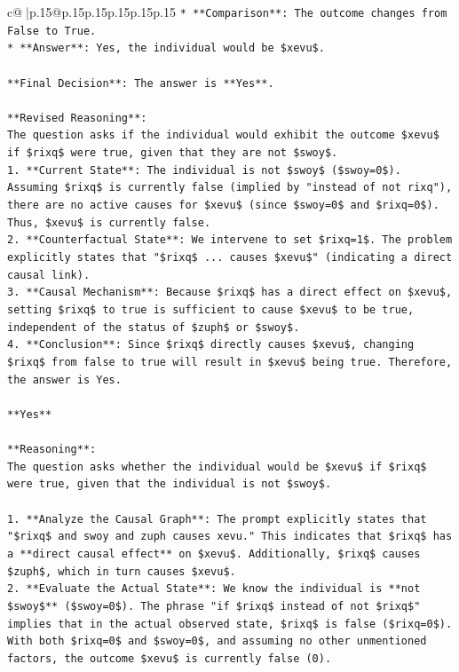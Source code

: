 \documentclass{article}
\begin{document}
{\begin{supertabular}{c@{$\;$}|p{.15\linewidth}@{}p{.15\linewidth}p{.15\linewidth}p{.15\linewidth}p{.15\linewidth}p{.15\linewidth}}
{{{\texttt{*   **Comparison**: The outcome changes from False to True.} \\
\texttt{*   **Answer**: Yes, the individual would be \$xevu\$.} \\
\\ 
\texttt{**Final Decision**: The answer is **Yes**.} \\
\\ 
\texttt{**Revised Reasoning**:} \\
\texttt{The question asks if the individual would exhibit the outcome \$xevu\$ if \$rixq\$ were true, given that they are not \$swoy\$.} \\
\texttt{1.  **Current State**: The individual is not \$swoy\$ (\$swoy=0\$). Assuming \$rixq\$ is currently false (implied by "instead of not rixq"), there are no active causes for \$xevu\$ (since \$swoy=0\$ and \$rixq=0\$). Thus, \$xevu\$ is currently false.} \\
\texttt{2.  **Counterfactual State**: We intervene to set \$rixq=1\$. The problem explicitly states that "\$rixq\$ ... causes \$xevu\$" (indicating a direct causal link).} \\
\texttt{3.  **Causal Mechanism**: Because \$rixq\$ has a direct effect on \$xevu\$, setting \$rixq\$ to true is sufficient to cause \$xevu\$ to be true, independent of the status of \$zuph\$ or \$swoy\$.} \\
\texttt{4.  **Conclusion**: Since \$rixq\$ directly causes \$xevu\$, changing \$rixq\$ from false to true will result in \$xevu\$ being true. Therefore, the answer is Yes.} \\
\\ 
\texttt{**Yes**} \\
\\ 
\texttt{**Reasoning**:} \\
\texttt{The question asks whether the individual would be \$xevu\$ if \$rixq\$ were true, given that the individual is not \$swoy\$.} \\
\\ 
\texttt{1.  **Analyze the Causal Graph**: The prompt explicitly states that "\$rixq\$ and swoy and zuph causes xevu." This indicates that \$rixq\$ has a **direct causal effect** on \$xevu\$. Additionally, \$rixq\$ causes \$zuph\$, which in turn causes \$xevu\$.} \\
\texttt{2.  **Evaluate the Actual State**: We know the individual is **not \$swoy\$** (\$swoy=0\$). The phrase "if \$rixq\$ instead of not \$rixq\$" implies that in the actual observed state, \$rixq\$ is false (\$rixq=0\$). With both \$rixq=0\$ and \$swoy=0\$, and assuming no other unmentioned factors, the outcome \$xevu\$ is currently false (0).} \\
}}}
\end{supertabular}}
\end{document}
